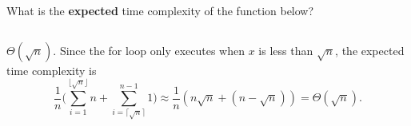 \begin{prob}
    What is the \textbf{expected} time complexity of the function below?

    \inputminted{python}{./code.py}

    \begin{soln}
        $\Theta(\sqrt n)$. Since the for loop only executes when $x$ is less than $\sqrt{n}$, the expected time complexity is 
        \[ \frac{1}{n} \bigg( \sum_{i = 1}^{\lfloor \sqrt{n} \rfloor} n + \sum_{i = \lceil \sqrt{n} \rceil}^{n - 1} 1 \bigg)  
        \approx \frac{1}{n} (n \sqrt{n} + (n - \sqrt{n})) = \Theta(\sqrt{n}). \]
    \end{soln}

\end{prob}
